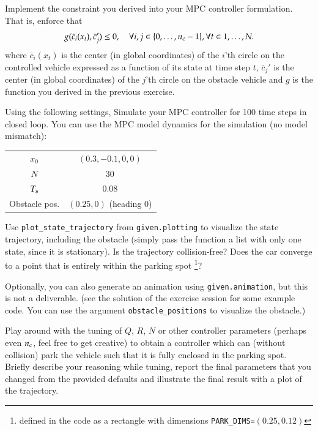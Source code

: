 \documentclass[]{article}
\begin{document}
\begin{assignment}
	Implement the constraint you derived into your MPC controller formulation.
	That is, enforce that 
	\[
		g(\bar{c}_i(x_t), \bar{c}_j') \leq 0, \quad \forall i,j \in \{0, \dots, n_{\mathrm{c}}-1\}, \forall t \in 1, \dots, N. 
	\]
	where $\bar{c}_{i}(x_t)$ is the center (in global coordinates) of the $i$'th circle on the 
	controlled vehicle expressed as a function of its state at time step $t$,
	$\bar{c}_j'$ is the center (in global coordinates) of the $j$'th circle 
	on the obstacle vehicle and $g$ is the function you derived in the previous 
	exercise.

	Using the following settings, Simulate your MPC controller for 100 time steps in closed loop.
	You can use the MPC model dynamics for the simulation (no model mismatch):
	
	\begin{center}
	\begin{tabular}{cc}
		\toprule
		$x_0$ & $(0.3, -0.1, 0, 0)$ \\
		$N$   & 30 \\ 
		$T_{\mathrm{s}}$ & 0.08 \\ 
		Obstacle pos. & $(0.25, 0)$ (heading 0)\\
		\bottomrule
	\end{tabular}
	\end{center}
	
	Use \texttt{plot\_state\_trajectory} from \texttt{given.plotting} to 
	visualize the state trajectory, including the obstacle (simply pass the function a list with only one state, since it is stationary).
	Is the trajectory collision-free? 
	Does the car converge to a point that is entirely within the parking spot
	\footnote{
	defined in the code as a rectangle with dimensions \texttt{PARK\_DIMS=}$(0.25, 0.12)$
	}?

	Optionally, you can also generate an animation using \texttt{given.animation}, but this is 
	not a deliverable.
	(see the solution of the exercise session for some example code. You can use the argument \texttt{obstacle\_positions} to visualize the obstacle.)

\end{assignment}

		

\begin{assignment}
	Play around with the tuning of $Q$, $R$, $N$ or other controller parameters (perhaps even $n_{\mathrm{c}}$, feel free to get creative)
	to obtain a controller which can (without collision) park the vehicle such that it is fully enclosed in the 
	parking spot. Briefly describe your reasoning while tuning, 
	report the final parameters that you changed from the provided defaults
	and illustrate the final result with a plot of the trajectory.
\end{assignment}
\end{document}
